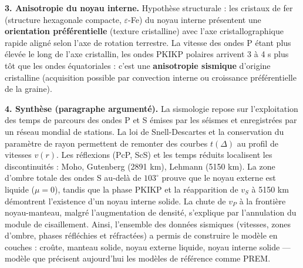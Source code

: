 \documentclass[11pt]{article}
\begin{document}
\begin{corrige}
\textbf{3. Anisotropie du noyau interne.} Hypothèse structurale : les cristaux de fer (structure hexagonale compacte, $\varepsilon$-Fe) du noyau interne présentent une \textbf{orientation préférentielle} (texture cristalline) avec l'axe cristallographique rapide aligné selon l'axe de rotation terrestre. La vitesse des ondes P étant plus élevée le long de l'axe cristallin, les ondes PKIKP polaires arrivent 3 à 4 s plus tôt que les ondes équatoriales : c'est une \textbf{anisotropie sismique} d'origine cristalline (acquisition possible par convection interne ou croissance préférentielle de la graine).

\textbf{4. Synthèse (paragraphe argumenté).} La sismologie repose sur l'exploitation des temps de parcours des ondes P et S émises par les séismes et enregistrées par un réseau mondial de stations. La loi de Snell-Descartes et la conservation du paramètre de rayon permettent de remonter des courbes $t(\Delta)$ au profil de vitesses $v(r)$. Les réflexions (PcP, ScS) et les temps réduits localisent les discontinuités : Moho, Gutenberg (2891 km), Lehmann (5150 km). La zone d'ombre totale des ondes S au-delà de $103^\circ$ prouve que le noyau externe est liquide ($\mu = 0$), tandis que la phase PKIKP et la réapparition de $v_S$ à 5150 km démontrent l'existence d'un noyau interne solide. La chute de $v_P$ à la frontière noyau-manteau, malgré l'augmentation de densité, s'explique par l'annulation du module de cisaillement. Ainsi, l'ensemble des données sismiques (vitesses, zones d'ombre, phases réfléchies et réfractées) a permis de construire le modèle en couches : croûte, manteau solide, noyau externe liquide, noyau interne solide --- modèle que précisent aujourd'hui les modèles de référence comme PREM.
\end{corrige}
\end{document}
